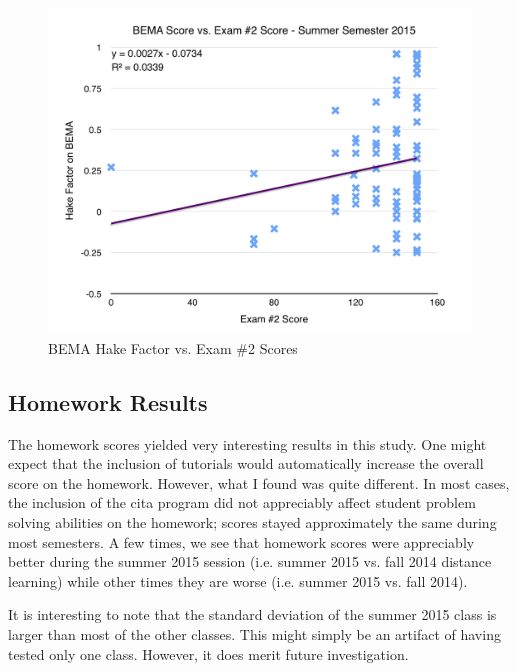 \begin{figure}
	\centering
	\includegraphics[width=5in]{img/chapter4/bema_vs_ex2_su15}
	\caption[BEMA Hake Factor vs. Exam \#2 Scores]{BEMA Hake Factor vs. Exam \#2 Scores}
  \label{fig:bemaVsExTwoSu15}
\end{figure}

\subsection{Homework Results}

The homework scores yielded very interesting results in this study. One might expect that the inclusion of tutorials would automatically increase the overall score on the homework. However, what I found was quite different. In most cases, the inclusion of the \gls{cita} program did not appreciably affect student problem solving abilities on the homework; scores stayed approximately the same during most semesters. A few times, we see that homework scores were appreciably better during the summer 2015 session (i.e. summer 2015 vs. fall 2014 distance learning) while other times they are worse (i.e. summer 2015 vs. fall 2014).

It is interesting to note that the standard deviation of the summer 2015 class is larger than most of the other classes. This might simply be an artifact of having tested only one class. However, it does merit future investigation.


